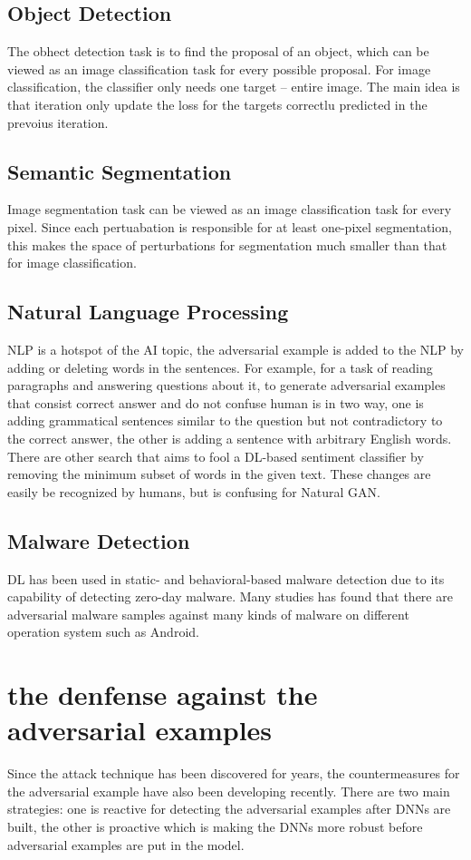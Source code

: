\documentclass[twoside,twocolumn]{article}
\begin{document}
\subsection{Object Detection}
The obhect detection task is to find the proposal of an object, which can be viewed as an image classification task for every possible proposal. For image classification, the classifier only needs one target -- entire image. The main idea is that iteration only update the loss for the targets correctlu predicted in the prevoius iteration. 
\subsection{Semantic Segmentation}
Image segmentation task can be viewed as an image classification task for every pixel. Since each pertuabation is responsible for at least one-pixel segmentation, this makes the space of perturbations for segmentation much smaller than that for image classification.
\subsection{Natural Language Processing}
NLP is a hotspot of the AI topic, the adversarial example is added to the NLP by adding or deleting words in the sentences. For example, for a task of reading paragraphs and answering questions about it, to generate adversarial examples that consist correct answer and do not confuse human is in two way, one is adding grammatical sentences similar to the question but not contradictory to the correct answer, the other is adding a sentence with arbitrary English words.
There are other search that aims to fool a DL-based sentiment classifier by removing the minimum subset of words in the given text. These changes are easily be recognized by humans, but is confusing for Natural GAN.
\subsection{Malware Detection}
DL has been used in static- and behavioral-based malware detection due to its capability of detecting zero-day malware. Many studies has found that there are adversarial malware samples against many kinds of malware on different operation system such as Android. 
\section{the denfense against the adversarial examples}
Since the attack technique has been discovered for years, the countermeasures for the adversarial example have also been developing recently. There are two main strategies: one is reactive for detecting the adversarial examples after DNNs are built, the other is proactive which is making the DNNs more robust before adversarial examples are put in the model.
\end{document}
